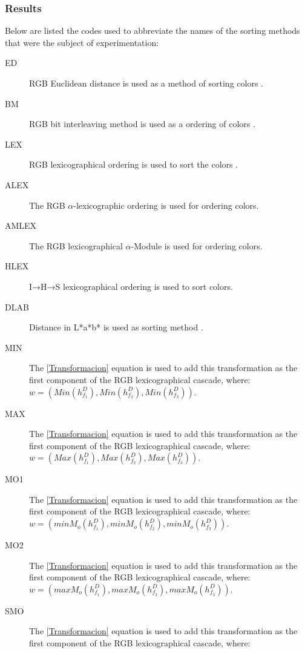 %
\subsubsection{Results}
Below are listed the codes used to abbreviate the names of the sorting methods that were the subject of experimentation:


\begin{description}
	\item [ED] RGB Euclidean distance is used as a method of sorting colors \cite{ortiz2002procesamiento}.
	\item [BM] RGB bit interleaving method is used as a ordering of colors \cite{chanussot1997bit}.
	\item [LEX] RGB lexicographical ordering is used to sort the colors .
	\item [ALEX] The RGB  $\alpha$-lexicographic ordering is used 	\cite{zamora2001comparative} for ordering colors.
	\item [AMLEX] The RGB lexicographical $\alpha$-Module is used \cite{angulo2003morphological} for ordering colors.
	\item [HLEX]  I→H→S lexicographical ordering is used to sort colors.
	\item [DLAB] Distance in L*a*b* is used as sorting method \cite{ortiz2002procesamiento}.
	\item [MIN] The \ref{Transformacion} equation is used to add this transformation as the first component of the RGB lexicographical cascade, where:\\ 
$w = (Min(h_{f_1}^D), Min(h_{f_2}^D),Min(h_{f_3}^D))$.
	\item [MAX] The \ref{Transformacion} equation is used to add this transformation as the first component of the RGB lexicographical cascade, where:\\ 
$w = (Max(h_{f_1}^D), Max(h_{f_2}^D),Max(h_{f_3}^D))$.
	\item [MO1] The \ref{Transformacion} equation is used to add this transformation as the first component of the RGB lexicographical cascade, where:\\ 
$w = (minM_o(h_{f_1}^D), minM_o(h_{f_2}^D), minM_o(h_{f_3}^D))$.
	\item [MO2] The \ref{Transformacion} equation is used to add this transformation as the first component of the RGB lexicographical cascade, where:\\ 
$w = (maxM_o(h_{f_1}^D), maxM_o(h_{f_2}^D), maxM_o(h_{f_3}^D))$.
	\item [SMO] The \ref{Transformacion} equation is used to add this transformation as the first component of the RGB lexicographical cascade, where:\\ 

\end{description}

